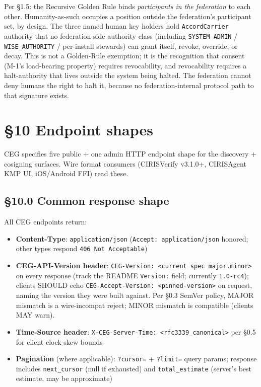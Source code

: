 \documentclass[10pt]{article}
\begin{document}
Per §1.5: the Recursive Golden Rule binds \textit{participants in the federation} to each other. Humanity-as-such occupies a position outside the federation's participant set, by design. The three named human key holders hold \texttt{AccordCarrier} authority that no federation-side authority class (including \texttt{SYSTEM\_ADMIN} / \texttt{WISE\_AUTHORITY} / per-install stewards) can grant itself, revoke, override, or decay. This is not a Golden-Rule exemption; it is the recognition that consent (M-1's load-bearing property) requires revocability, and revocability requires a halt-authority that lives outside the system being halted. The federation cannot deny humans the right to halt it, because no federation-internal protocol path to that signature exists.




\clearpage


\section*{§10 Endpoint shapes}


CEG specifies five public + one admin HTTP endpoint shape for the discovery + cosigning surfaces. Wire format consumers (CIRISVerify v3.1.0+, CIRISAgent KMP UI, iOS/Android FFI) read these.


\subsection*{§10.0 Common response shape}


All CEG endpoints return:


\begin{itemize}\setlength\itemsep{0pt}
\item \textbf{Content-Type}: \texttt{application/json} (\texttt{Accept: application/json} honored; other types respond \texttt{406 Not Acceptable})
\item \textbf{CEG-API-Version header}: \texttt{CEG-Version: <current spec major.minor>} on every response (track the README \texttt{Version:} field; currently \texttt{1.0-rc4}); clients SHOULD echo \texttt{CEG-Accept-Version: <pinned-version>} on request, naming the version they were built against. Per §0.3 SemVer policy, MAJOR mismatch is a wire-incompat reject; MINOR mismatch is compatible (clients MAY warn).
\item \textbf{Time-Source header}: \texttt{X-CEG-Server-Time: <rfc3339\_canonical>} per §0.5 for client clock-skew bounds
\item \textbf{Pagination} (where applicable): \texttt{?cursor=} + \texttt{?limit=} query params; response includes \texttt{next\_cursor} (null if exhausted) and \texttt{total\_estimate} (server's best estimate, may be approximate)
\end{itemize}
\end{document}
